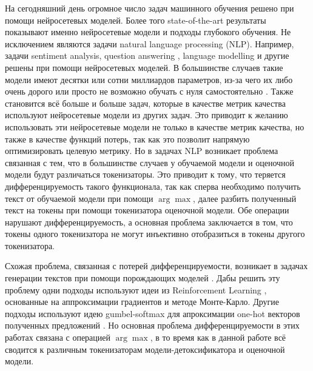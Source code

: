 На сегодняшний день огромное число задач машинного обучения решено при помощи нейросетевых моделей.
Более того state-of-the-art результаты показывают именно нейросетевые модели и подходы глубокого обучения. 
Не исключением являются задачи natural language processing (NLP).
Например, задачи sentiment analysis, question answering \cite{t5}, language modelling \cite{gpt3} и другие решены при помощи нейросетевых моделей.
В большинстве случаев такие модели имеют десятки или сотни миллиардов параметров, из-за чего их либо очень дорого или просто не возможно обучать с нуля самостоятельно \cite{gpt3, t5}.  
Также становится всё больше и больше задач, которые в качестве метрик качества используют нейросетевые модели из других задач. 
Это приводит к желанию использовать эти нейросетевые модели не только в качестве метрик качества, но также в качестве функций потерь, так как это позволит напрямую оптимизировать целевую метрику. 
Но в задачах NLP возникает проблема связанная с тем, что в большинстве случаев у обучаемой модели и оценочной модели будут различаться токенизаторы. 
Это приводит к тому, что теряется дифференцируемость такого функционала, так как сперва необходимо получить текст от обучаемой модели при помощи $\arg\max$, далее разбить полученный текст на токены при помощи токенизатора оценочной модели. 
Обе операции нарушают дифференцируемость, а основная проблема заключается в том, что
токены одного токенизатора не могут инъективно отобразиться в токены другого токенизатора.

Схожая проблема, связанная с потерей дифференцируемости, возникает в задачах генерации текстов при помощи порождающих моделей \cite{gan-bert, gan-wo-rl}.
Дабы решить эту проблему одни подходы используют идеи из Reinforcement Learning \cite{Yu_Zhang_Wang_Yu_2017}, основанные на аппроксимации градиентов и методе Монте-Карло.
Другие подходы используют идею gumbel-softmax для апроксимации one-hot векторов полученных предложений \cite{kusner2016gans}.
Но основная проблема дифференцируемости в этих работах связана с операцией $\arg\max$, в то время как в данной работе всё сводится к различным токенизаторам модели-детоксификатора и оценочной модели. 


